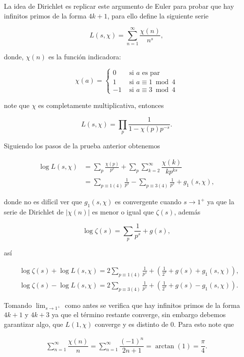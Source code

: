 La idea de Dirichlet es replicar este argumento de Euler para probar que hay infinitos primos de la forma $4k+1$, para ello define la siguiente serie

$$
L(s, \chi)=\sum_{n=1}^{\infty} \frac{\chi(n)}{n^s},
$$

donde, $\chi(n)$ es la función indicadora:

$$
\chi(a)= \begin{cases}0 & \text { si } a \text { es par } \\ 1 & \text { si } a \equiv 1 \bmod 4 \\ -1 & \text { si } a \equiv 3 \bmod 4\end{cases}
$$

note que $\chi$ es completamente multiplicativa, entonces

$$
L(s, \chi)=\prod_p \frac{1}{1-\chi(p) p^{-s}}.
$$

Siguiendo los pasos de la prueba anterior obtenemos

\begin{align*}
    \log L(s, \chi)&=\sum_p \frac{\chi(p)}{p^s}+\sum_p\sum_{k=2}^{\infty}\dfrac{\chi(k)}{kp^{ks}}\\
    &=\sum_{p\equiv 1(4)}\frac{1}{p^s}- \sum_{p\equiv 3(4)}\frac{1}{p^s}+g_1(s,\chi)
,\end{align*}

donde no es difícil ver que $g_1(s,\chi)$ es convergente cuando $s\to 1^{+}$ ya que la serie de Dirichlet de $|\chi(n)|$ es menor o igual que $\zeta(s)$, además

$$\log \zeta(s)=\sum_p \frac{1}{p^s}+g(s),$$

así

$$\begin{aligned}
& \log \zeta(s)+\log L(s, \chi)=2 \sum_{p \equiv 1(4)} \frac{1}{p^s}+\left(\frac{1}{2^s}+g(s)+g_1(s, \chi)\right), \\
& \log \zeta(s)-\log L(s, \chi)=2 \sum_{p \equiv 3(4)} \frac{1}{p^s}+\left(\frac{1}{2^s}+g(s)-g_1(s, \chi)\right).
\end{aligned}$$

Tomando $\lim_{s\to 1^{+}}$ como antes se verifica que hay infinitos primos de la forma $4k+1$ y $4k+3$ ya que el término restante converge, sin embargo debemos garantizar algo, que $L(1,\chi)$ converge y es distinto de 0. Para esto note  que

\begin{align*}
    \sum_{n=1}^{\infty}\dfrac{\chi(n)}{n}=\sum_{n=1}^{\infty}\dfrac{(-1)^n}{2n+1}=\arctan(1)=\dfrac{\pi}{4}
.\end{align*}

